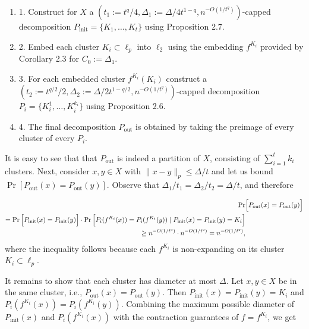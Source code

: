 \par
\begin{enumerate}
\item[]  1. 
Construct for $X$ a $(t_{1}:=t^{q}/4,\Delta_{1}:=\Delta/4t^{1-q},n^{-O(1/t^{q})})$-capped decomposition $P_{\text{init}}=\{K_{1},\ldots,K_{t}\}$ using Proposition 2.7.
\par
\par
\item[]  2. 
Embed each cluster $K_{i}\subset\ell_{p}$ into $\ell_{2}$ using the embedding $f^{K_{i}}$ provided by Corollary 2.3 for $C_{0}:=\Delta_{1}$.
\par
\par
\item[]  3. 
For each embedded cluster $f^{K_{i}}(K_{i})$ construct a $(t_{2}:=t^{q/2}/2,\Delta_{2}:=\Delta/2t^{1-q/2},n^{-O(1/t^{q})})$-capped decomposition $P_{i}=\{K_{i}^{1},\ldots,K_{i}^{k_{i}}\}$ using Proposition 2.6.
\par
\par
\item[]  4. 
The final decomposition $P_{\text{out}}$ is obtained by taking the preimage of every cluster of every $P_{i}$.
\par
\par
\end{enumerate}
\par
It is easy to see that that $P_{\text{out}}$ is indeed a partition of $X$, consisting of $\sum_{i=1}^{t}k_{i}$ clusters. Next, consider $x,y\in X$ with $\|x-y\|_{p}\leq\Delta/t$ and let us bound $\Pr[P_{\text{out}}(x)=P_{\text{out}}(y)]$. Observe that $\Delta_{1}/t_{1}=\Delta_{2}/t_{2}=\Delta/t$, and therefore
\par
\[\begin{aligned}
\displaystyle\Pr & \displaystyle\Big{[}P_{\text{out}}(x)=P_{\text{out}}(y)\Big{]} \\
\displaystyle=\Pr\Big{[}P_{\text{init}}(x)=P_{\text{init}}(y)\Big{]}\cdot\Pr%
\Big{[}P_{i}(f^{K_{i}}(x))=P_{i}(f^{K_{i}}(y))\mid P_{\text{init}}(x)=P_{\text%
{init}}(y)=K_{i}\Big{]} \\
\displaystyle\geq n^{-O\left(1/t^{q}\right)}\cdot n^{-O\left(1/t^{q}\right)}=n%
^{-O\left(1/t^{q}\right)},
\end{aligned}\]
where the inequality follows because each $f^{K_{i}}$ is non-expanding on its cluster $K_{i}\subset\ell_{p}$.
\par
\par
It remains to show that each cluster has diameter at most $\Delta$. Let $x,y\in X$ be in the same cluster, i.e., $P_{\text{out}}(x)=P_{\text{out}}(y)$. Then $P_{\text{init}}(x)=P_{\text{init}}(y)=K_{i}$ and $P_{i}(f^{K_{i}}(x))=P_{i}(f^{K_{i}}(y))$. Combining the maximum possible diameter of $P_{\text{init}}(x)$ and $P_{i}(f^{K_{i}}(x))$ with the contraction guarantees of $f=f^{K_{i}}$, we get
